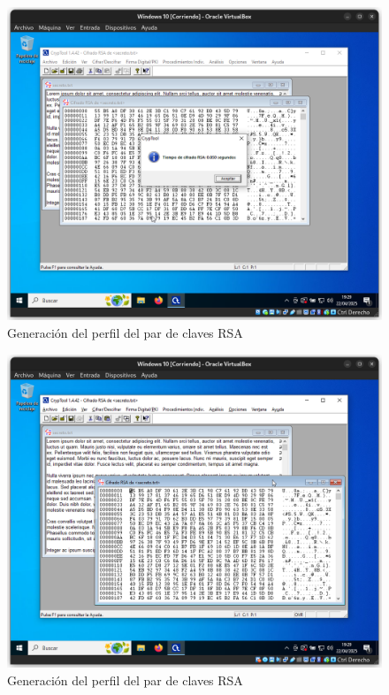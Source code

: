 \begin{figure}[H]
    \includegraphics[width=15cm]{EncriptadoRSA-2}
    \caption{Generación del perfil del par de claves RSA}
\end{figure}

\begin{figure}[H]
    \includegraphics[width=15cm]{EncriptadoRSA-3}
    \caption{Generación del perfil del par de claves RSA}
\end{figure}


